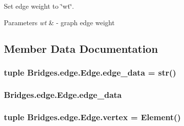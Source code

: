 Set edge weight to \char`\"{}wt\char`\"{}. 


\begin{DoxyParams}{Parameters}
{\em wt} & -\/ graph edge weight \\
\hline
\end{DoxyParams}


\subsection{Member Data Documentation}
\hypertarget{class_bridges_1_1edge_1_1_edge_a982756166f2c8c6321a060cc377f2c04}{}
\subsubsection[{edge\+\_\+data}]{\setlength{\rightskip}{0pt plus 5cm}tuple Bridges.\+edge.\+Edge.\+edge\+\_\+data = str()\hspace{0.3cm}{\ttfamily [static]}}\label{class_bridges_1_1edge_1_1_edge_a982756166f2c8c6321a060cc377f2c04}
\hypertarget{class_bridges_1_1edge_1_1_edge_a7677bdbf69f6a1725be3bb79e2bb1c7e}{}
\subsubsection[{edge\+\_\+data}]{\setlength{\rightskip}{0pt plus 5cm}Bridges.\+edge.\+Edge.\+edge\+\_\+data}\label{class_bridges_1_1edge_1_1_edge_a7677bdbf69f6a1725be3bb79e2bb1c7e}
\hypertarget{class_bridges_1_1edge_1_1_edge_a1cded0b08960b1a7fa0d8c1505315651}{}
\subsubsection[{vertex}]{\setlength{\rightskip}{0pt plus 5cm}tuple Bridges.\+edge.\+Edge.\+vertex = Element()\hspace{0.3cm}{\ttfamily [static]}}\label{class_bridges_1_1edge_1_1_edge_a1cded0b08960b1a7fa0d8c1505315651}
\hypertarget{class_bridges_1_1edge_1_1_edge_a785d6e63ec4a7ec1b49c9e4a81a802dc}{}
